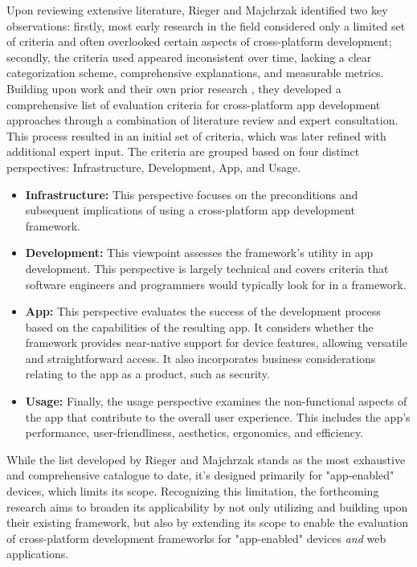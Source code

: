 Upon reviewing extensive literature, Rieger and Majchrzak \cite{Rieger.2019} identified two key observations: firstly, most early research in the field considered only a limited set of criteria and often overlooked certain aspects of cross-platform development; secondly, the criteria used appeared inconsistent over time, lacking a clear categorization scheme, comprehensive explanations, and measurable metrics.
Building upon \cite{Heitkotter.2013} work and their own prior research \cite{Rieger.2016, Rieger.2018}, they developed a comprehensive list of evaluation criteria for cross-platform app development approaches through a combination of literature review and expert consultation. This process resulted in an initial set of criteria, which was later refined with additional expert input. The criteria are grouped based on four distinct perspectives: Infrastructure, Development, App, and Usage.
\begin{itemize}
    \item \textbf{Infrastructure:} This perspective focuses on the preconditions and subsequent implications of using a cross-platform app development framework.
    \item \textbf{Development:} This viewpoint assesses the framework's utility in app development. This perspective is largely technical and covers criteria that software engineers and programmers would typically look for in a framework.
    \item \textbf{App:} This perspective evaluates the success of the development process based on the capabilities of the resulting app. It considers whether the framework provides near-native support for device features, allowing versatile and straightforward access. It also incorporates business considerations relating to the app as a product, such as security.
    \item \textbf{Usage:} Finally, the usage perspective examines the non-functional aspects of the app that contribute to the overall user experience. This includes the app's performance, user-friendliness, aesthetics, ergonomics, and efficiency.
\end{itemize}
While the list developed by Rieger and Majchrzak stands as the most exhaustive and comprehensive catalogue to date, it's designed primarily for "app-enabled" devices, which limits its scope. Recognizing this limitation, the forthcoming research aims to broaden its applicability by not only utilizing and building upon their existing framework, but also by extending its scope to enable the evaluation of cross-platform development frameworks for "app-enabled" devices \emph{and} web applications.



